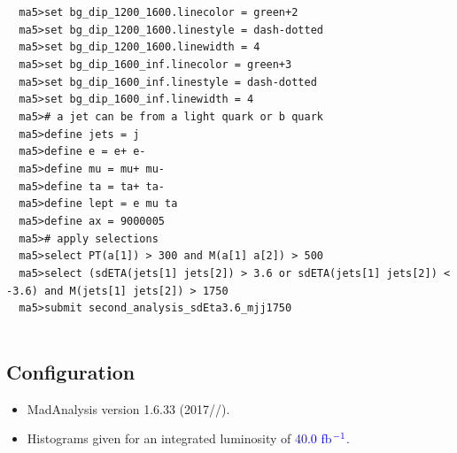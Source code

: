 \documentclass[a4paper, 10pt]{article}
\begin{document}
\texttt{ }\texttt{ }\texttt{ma5>set bg\_dip\_1200\_1600.linecolor = green+2\\
}
\texttt{ }\texttt{ }\texttt{ma5>set bg\_dip\_1200\_1600.linestyle = dash-dotted\\
}
\texttt{ }\texttt{ }\texttt{ma5>set bg\_dip\_1200\_1600.linewidth = 4\\
}
\texttt{ }\texttt{ }\texttt{ma5>set bg\_dip\_1600\_inf.linecolor = green+3\\
}
\texttt{ }\texttt{ }\texttt{ma5>set bg\_dip\_1600\_inf.linestyle = dash-dotted\\
}
\texttt{ }\texttt{ }\texttt{ma5>set bg\_dip\_1600\_inf.linewidth = 4\\
}
\texttt{ }\texttt{ }\texttt{ma5>\# a jet can be from a light quark or b quark\\
}
\texttt{ }\texttt{ }\texttt{ma5>define jets = j\\
}
\texttt{ }\texttt{ }\texttt{ma5>define e = e+ e-\\
}
\texttt{ }\texttt{ }\texttt{ma5>define mu = mu+ mu-\\
}
\texttt{ }\texttt{ }\texttt{ma5>define ta = ta+ ta-\\
}
\texttt{ }\texttt{ }\texttt{ma5>define lept = e mu ta\\
}
\texttt{ }\texttt{ }\texttt{ma5>define ax = 9000005\\
}
\texttt{ }\texttt{ }\texttt{ma5>\# apply selections\\
}
\texttt{ }\texttt{ }\texttt{ma5>select PT(a[1]) > 300 and M(a[1] a[2]) > 500\\
}
\texttt{ }\texttt{ }\texttt{ma5>select (sdETA(jets[1] jets[2]) > 3.6 or sdETA(jets[1] jets[2]) < -3.6) and M(jets[1] jets[2]) > 1750\\
}
\texttt{ }\texttt{ }\texttt{ma5>submit second\_analysis\_sdEta3.6\_mjj1750\\
}
\texttt{ }\texttt{ }\subsection{ Configuration}

\begin{itemize}
  \item MadAnalysis version 1.6.33 (2017//).
   \item Histograms given for an integrated luminosity of \textcolor{blue}{40.0}\textcolor{blue}{ fb}$^{\textcolor{blue}{-1}}$\textcolor{blue}{.}
\textcolor{blue}{}
\end{itemize}
\newpage
\end{document}
